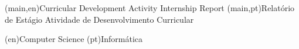 
%




%
%
%
%
\nttitle(main,en){Curricular Development Activity Internship Report}%
\nttitle(main,pt){Relatório de Estágio Atividade de Desenvolvimento Curricular}%




%
%
%
%
\ntdepartment*(en){Computer Science} %
\ntdepartment*(pt){Informática}   %




